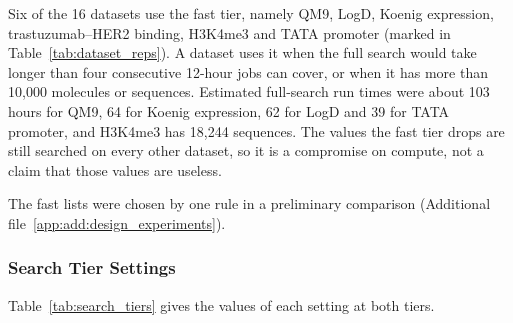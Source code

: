 Six of the 16 datasets use the fast tier, namely QM9, LogD, Koenig expression, trastuzumab--HER2 binding, H3K4me3 and TATA promoter (marked in Table~\ref{tab:dataset_reps}). A dataset uses it when the full search would take longer than four consecutive 12-hour jobs can cover, or when it has more than 10,000 molecules or sequences. Estimated full-search run times were about 103 hours for QM9, 64 for Koenig expression, 62 for LogD and 39 for TATA promoter, and H3K4me3 has 18,244 sequences. The values the fast tier drops are still searched on every other dataset, so it is a compromise on compute, not a claim that those values are useless.

The fast lists were chosen by one rule in a preliminary comparison (Additional file~\ref{app:add:design_experiments}).

\subsubsection{Search Tier Settings}

Table~\ref{tab:search_tiers} gives the values of each setting at both tiers.

